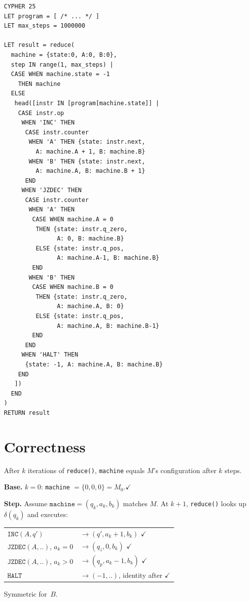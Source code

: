 \documentclass[sigconf, anonymous, review, nonacm]{acmart}
\begin{document}
\begin{codeblock}
\begin{lstlisting}[style=cypher]
CYPHER 25
LET program = [ /* ... */ ]
LET max_steps = 1000000

LET result = reduce(
  machine = {state:0, A:0, B:0},
  step IN range(1, max_steps) |
  CASE WHEN machine.state = -1
    THEN machine
  ELSE
   head([instr IN [program[machine.state]] |
    CASE instr.op
     WHEN 'INC' THEN
      CASE instr.counter
       WHEN 'A' THEN {state: instr.next,
         A: machine.A + 1, B: machine.B}
       WHEN 'B' THEN {state: instr.next,
         A: machine.A, B: machine.B + 1}
      END
     WHEN 'JZDEC' THEN
      CASE instr.counter
       WHEN 'A' THEN
        CASE WHEN machine.A = 0
         THEN {state: instr.q_zero,
               A: 0, B: machine.B}
         ELSE {state: instr.q_pos,
               A: machine.A-1, B: machine.B}
        END
       WHEN 'B' THEN
        CASE WHEN machine.B = 0
         THEN {state: instr.q_zero,
               A: machine.A, B: 0}
         ELSE {state: instr.q_pos,
               A: machine.A, B: machine.B-1}
        END
      END
     WHEN 'HALT' THEN
      {state: -1, A: machine.A, B: machine.B}
    END
   ])
  END
)
RETURN result
\end{lstlisting}
\end{codeblock}

\section{Correctness}

\begin{claimbox}[Claim]
After $k$ iterations of \texttt{reduce()}, \texttt{machine} equals
$M$'s configuration after $k$ steps.
\end{claimbox}

\begin{proofbox}
\textbf{Base.} $k{=}0$: \texttt{machine} $= \{0,0,0\} = M_0$.\enspace$\checkmark$

\textbf{Step.} Assume $\texttt{machine} = (q_k, a_k, b_k)$ matches $M$.
At $k{+}1$, \texttt{reduce()} looks up $\delta(q_k)$ and executes:

{\small
\begin{tabular}{@{}ll@{}}
$\texttt{INC}(A,q')$ & $\to (q', a_k{+}1, b_k)$ \enspace$\checkmark$ \\
$\texttt{JZDEC}(A,..)$, $a_k{=}0$ & $\to (q_z, 0, b_k)$ \enspace$\checkmark$ \\
$\texttt{JZDEC}(A,..)$, $a_k{>}0$ & $\to (q_p, a_k{-}1, b_k)$ \enspace$\checkmark$ \\
$\texttt{HALT}$ & $\to (-1, ..)$, identity after \enspace$\checkmark$ \\
\end{tabular}}

\noindent Symmetric for~$B$.
\end{proofbox}
\end{document}
